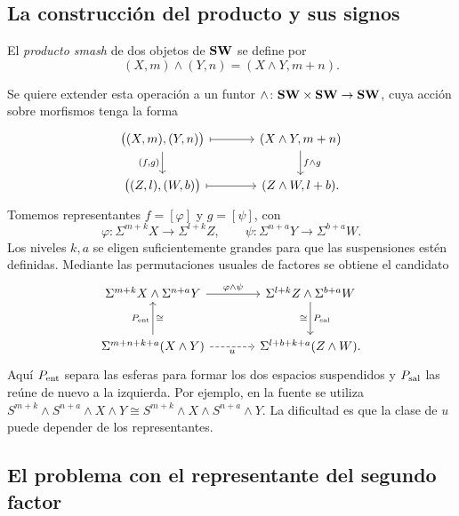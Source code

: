 \subsection{La construcción del producto y sus signos}

\begin{defi}\label{defi:smash}
El \emph{producto smash} de dos objetos de $\mathbf{SW}$ se define por
\[
(X,m)\wedge(Y,n)=(X\wedge Y,m+n).
\]

\end{defi}
Se quiere extender esta operación a un funtor $\wedge\colon\mathbf{SW}\times\mathbf{SW}\to\mathbf{SW}$, cuya acción sobre morfismos tenga la forma
\[
\begin{tikzcd}[column sep=large]
\bigl((X,m),(Y,n)\bigr) \arrow[d,"{(f,g)}"'] \arrow[r,mapsto] & (X\wedge Y,m+n) \arrow[d,"f\wedge g"]\\
\bigl((Z,l),(W,b)\bigr) \arrow[r,mapsto] & (Z\wedge W,l+b).
\end{tikzcd}
\]
Tomemos representantes $f=[\varphi]$ y $g=[\psi]$, con
\[
\varphi\colon\Sigma^{m+k}X\longrightarrow\Sigma^{l+k}Z,
\qquad
\psi\colon\Sigma^{n+a}Y\longrightarrow\Sigma^{b+a}W.
\]
Los niveles $k,a$ se eligen suficientemente grandes para que las suspensiones estén definidas. Mediante las permutaciones usuales de factores se obtiene el candidato
\[
\begin{tikzcd}[column sep=large,row sep=large]
\Sigma^{m+k}X\wedge\Sigma^{n+a}Y \arrow[r,"\varphi\wedge\psi"] & \Sigma^{l+k}Z\wedge\Sigma^{b+a}W \arrow[d,"P_{\rm sal}","\cong"']\\
\Sigma^{m+n+k+a}(X\wedge Y) \arrow[u,"P_{\rm ent}","\cong"'] \arrow[r,dashed,"u"'] & \Sigma^{l+b+k+a}(Z\wedge W).
\end{tikzcd}
\]
Aquí $P_{\rm ent}$ separa las esferas para formar los dos espacios suspendidos y $P_{\rm sal}$ las reúne de nuevo a la izquierda. Por ejemplo, en la fuente se utiliza $S^{m+k}\wedge S^{n+a}\wedge X\wedge Y\cong S^{m+k}\wedge X\wedge S^{n+a}\wedge Y$. La dificultad es que la clase de $u$ puede depender de los representantes.

\subsection{El problema con el representante del segundo factor}

